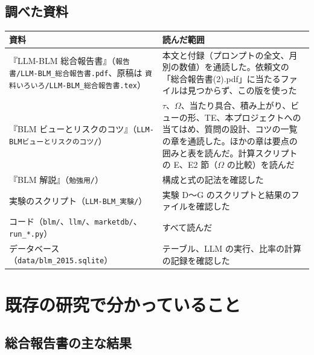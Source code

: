 \documentclass[xelatex,ja=standard,jafont=haranoaji,a4paper,10pt,openany]{bxjsreport}
\newcommand{\code}[1]{\texttt{#1}}
\begin{document}
\section*{調べた資料}

\begin{center}
\small
\begin{tabular}{p{5.4cm}p{8.8cm}}
\toprule
資料 & 読んだ範囲 \\
\midrule
『LLM-BLM 総合報告書』（\code{報告書/LLM-BLM\_総合報告書.pdf}、原稿は \code{資料いろいろ/LLM-BLM\_総合報告書.tex}） & 本文と付録（プロンプトの全文、月別の数値）を通読した。依頼文の「総合報告書(2).pdf」に当たるファイルは見つからず、この版を使った \\
『BLM ビューとリスクのコツ』（\code{LLM-BLMビューとリスクのコツ/}） & $\tau$、$\Omega$、当たり具合、積み上がり、ビューの形、TE、本プロジェクトへの当てはめ、質問の設計、コツの一覧の章を通読した。ほかの章は要点の囲みと表を読んだ。計算スクリプトの E、E2 節（$\Omega$ の比較）を読んだ \\
『BLM 解説』（\code{勉強用/}） & 構成と式の記法を確認した \\
実験のスクリプト（\code{LLM-BLM\_実験/}） & 実験 D〜G のスクリプトと結果のファイルを確認した \\
コード（\code{blm/}、\code{llm/}、\code{marketdb/}、\code{run\_*.py}） & すべて読んだ \\
データベース（\code{data/blm\_2015.sqlite}） & テーブル、LLM の実行、比率の計算の記録を確認した \\
\bottomrule
\end{tabular}
\end{center}

\chapter{既存の研究で分かっていること}\label{ch:known}

\section{総合報告書の主な結果}
\end{document}
